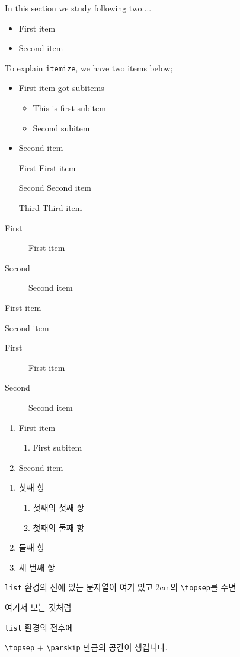 \documentclass[11pt]{article}
\begin{document}
In this section we study following two....
\begin{itemize}
\item First item
\item Second item
\end{itemize}

To explain \texttt{itemize}, we have two items below;
\begin{itemize}
\item First item got subitems
\begin{itemize}
\item This is first subitem
\item Second subitem
\end{itemize}
\item Second item
\end{itemize}

\begin{itemize}
\item[First] First item
\item[Second] Second item
\item[Third] Third item
\end{itemize}

\begin{description}
\item[First] First item
\item[Second] Second item
\end{description}

\begin{description}
\item First item
\item Second item
\end{description}

\begin{description}
\item[First] First item
\item[Second] Second item
\end{description}

\begin{enumerate}
\item First item
\begin{enumerate}
\item First subitem
\end{enumerate}
\item Second item
\end{enumerate}

\begin{enumerate}
\item 첫째 항
\begin{enumerate}
\item 첫째의 첫째 항
\item 첫째의 둘째 항
\end{enumerate}
\item 둘째 항
\item 세 번째 항
\end{enumerate}

\texttt{list} 환경의 전에 있는 문자열이 여기 있고 2cm의 \verb|\topsep|를 주면
\begin{list}{\bfseries 항목}{\topsep=2cm}
\item 여기서 보는 것처럼
\item \texttt{list} 환경의 전후에
\end{list}
\verb|\topsep| $+$ \verb|\parskip| 만큼의 공간이 생깁니다.
\end{document}
